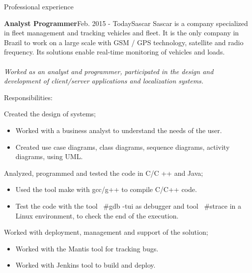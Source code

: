 \documentclass{resume}
\begin{document}
  \begin{rSection}{Professional experience}

    \begin{rSubsection}{\fontsize{12}{14}\selectfont \bf Analyst Programmer}{\fontsize{12}{14}\selectfont Feb. 2015 - Today}{\fontsize{12}{14}\selectfont Sascar}{}
    Sascar is a company specialized in fleet management and tracking vehicles and fleet. It is the only company in Brazil to work on a large scale with GSM / GPS technology, satellite and radio frequency. Its solutions enable real-time monitoring of vehicles and loads.\\\\
    \textit{Worked as an analyst and programmer, participated in the design and development of client/server applications and localization systems.}

    \end{rSubsection}

      \begin{rSubsection}{\fontsize{9}{10}\selectfont Responsibilities:}{}{}{}
        \item Created the design of systems;
          \begin{addmargin}[1em]{2em}
            \renewcommand\labelitemi{$\cdot$}
            \begin{itemize}
              \item Worked with a business analyst to understand the needs of the user.
              \item Created use case diagrams, class diagrams, sequence diagrams, activity diagrams, using UML.
            \end{itemize}
          \end{addmargin}
        \item Analyzed, programmed and tested the code in C/C ++ and Java;
            \begin{addmargin}[1em]{2em}
              \renewcommand\labelitemi{$\cdot$}
              \begin{itemize}
                \item Used the tool make with gcc/g++ to compile C/C++ code.
                \item Test the code with the tool \ #gdb -tui as debugger and tool \ #strace in a Linux environment, to check the end of the execution. 
              \end{itemize}
            \end{addmargin}
        \item Worked with deployment, management and support of the solution;
            \begin{addmargin}[1em]{2em}
              \renewcommand\labelitemi{$\cdot$}
              \begin{itemize}
                \item Worked with the Mantis tool for tracking bugs.
                \item Worked with Jenkins tool to build and deploy.
              \end{itemize}
            \end{addmargin}        
      \end{rSubsection}


\end{rSection}
\end{document}

